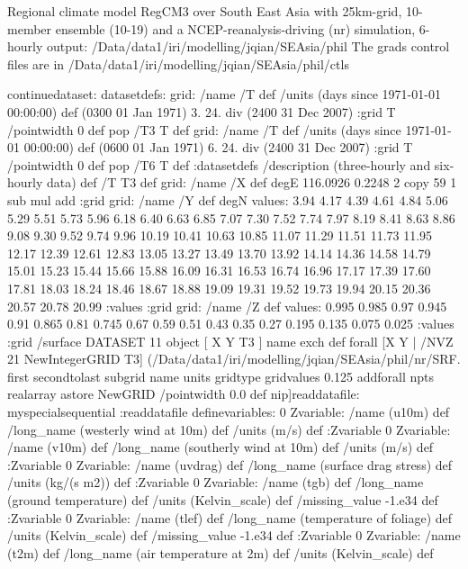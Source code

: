 Regional climate model RegCM3 over South East Asia  with 25km-grid, 10-member ensemble (10-19) and a NCEP-reanalysis-driving (nr) simulation, 6-hourly output:
/Data/data1/iri/modelling/jqian/SEAsia/phil
The grads control files are in /Data/data1/iri/modelling/jqian/SEAsia/phil/ctls
\begin{ingrid}
continuedataset:
datasetdefs:
grid:
/name /T def
/units (days since  1971-01-01 00:00:00) def
(0300 01 Jan 1971)
3. 24. div
(2400 31 Dec 2007)
:grid
T /pointwidth 0 def pop
/T3 T def
grid:
/name /T def
/units (days since  1971-01-01 00:00:00) def
(0600 01 Jan 1971)
6. 24. div
(2400 31 Dec 2007)
:grid
T /pointwidth 0 def pop
/T6 T def
:datasetdefs
/description (three-hourly and six-hourly data) def
/T T3 def
grid:
/name /X def
degE
116.0926 0.2248 2 copy 59 1 sub mul add
:grid
grid:
/name /Y def
degN
values:
3.94   4.17   4.39   4.61   4.84   5.06   5.29   5.51   5.73   5.96
   6.18   6.40   6.63   6.85   7.07   7.30   7.52   7.74   7.97   8.19
   8.41   8.63   8.86   9.08   9.30   9.52   9.74   9.96  10.19  10.41
  10.63  10.85  11.07  11.29  11.51  11.73  11.95  12.17  12.39  12.61
  12.83  13.05  13.27  13.49  13.70  13.92  14.14  14.36  14.58  14.79
  15.01  15.23  15.44  15.66  15.88  16.09  16.31  16.53  16.74  16.96
  17.17  17.39  17.60  17.81  18.03  18.24  18.46  18.67  18.88  19.09
  19.31  19.52  19.73  19.94  20.15  20.36  20.57  20.78  20.99
:values
:grid
grid:
/name /Z def
values:
0.995 0.985 0.97 0.945 0.91 0.865 0.81 0.745 0.67 0.59 0.51 0.43 0.35 0.27 0.195 0.135 0.075 0.025
:values
:grid
/surface {
DATASET 11 object
[ X Y T3 ] {  name exch def } forall
[X    Y | /NVZ 21 NewIntegerGRID
    T3] (/Data/data1/iri/modelling/jqian/SEAsia/phil/nr/SRF.%
        first secondtolast subgrid
        name units gridtype gridvalues
            {0.125 add}forall npts realarray astore
            NewGRID
         /pointwidth 0.0 def
         nip]readdatafile: 
myspecialsequential
:readdatafile
definevariables:
0 Zvariable: /name (u10m) def /long_name (westerly  wind at 10m)  def /units (m/s) def
:Zvariable
0 Zvariable: /name (v10m) def /long_name (southerly wind at 10m)  def /units (m/s) def
:Zvariable
0 Zvariable: /name (uvdrag) def /long_name (surface drag stress)  def /units (kg/(s m2)) def
:Zvariable
0 Zvariable: /name (tgb) def /long_name (ground temperature)  def /units (Kelvin_scale) def
/missing_value -1.e34 def
:Zvariable
0 Zvariable: /name (tlef) def /long_name (temperature of foliage)  def /units (Kelvin_scale) def
/missing_value -1.e34 def
:Zvariable
0 Zvariable: /name (t2m) def /long_name (air temperature at 2m)  def /units (Kelvin_scale) def
}
\end{ingrid}
